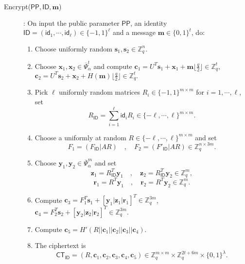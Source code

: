 \documentclass[runningheads,10pt]{llncs}
\def\ZZ{\mathbb{Z}}
\def\bf{\mathbf}
\def\PP{\mathsf{PP}}
\def\CT{\mathsf{CT}}
\def\b{\bf{b}}
\def\c{\bf{c}}
\def\ID{\mathsf{ID}}
\def\id{\mathsf{id}}
\begin{document}
\begin{description}
	\item[Encrypt($\PP,\ID,\bf{m}$)]: On input the public parameter $\PP$, an identity $\ID=(\id_1,\cdots,\id_\ell)\in\{-1,1\}^\ell$ and a message $\bf{m}\in\{0,1\}^t$, do:
	\begin{enumerate}
		\item Choose uniformly random $\bf{s}_1, \bf{s}_2\in\ZZ_q^n.$
		\item Choose $\bf{x}_1,\bf{x}_2\in\overline{\Psi}_\alpha^t$ and compute
		$\c_1 = U^T\bf{s}_1 +\bf{x}_1 +\bf{m}\big\lfloor\frac{q}{2}\big\rfloor \in\ZZ_q^t$,
		$\c_2 = U^T\bf{s}_2 +\bf{x}_2 +H(\bf{m})\big\lfloor\frac{q}{2}\big\rfloor \in\ZZ_q^t.$
		\item Pick $\ell$ uniformly random matrices $R_i\in\{-1,1\}^{m\times m}$ for $i=1,\cdots,\ell$, set
		$$R_{\ID}=\sum_{i=1}^\ell \id_iR_i\in\{-\ell,\cdots,\ell\}^{m\times m}.$$
		\item Choose a uniformly at random $R\in\{-\ell,\cdots, \ell\}^{m\times m}$ and set
		$$F_1=(F_\ID|AR)\quad,\quad F_2=(F'_\ID|AR)\in\ZZ_q^{n\times 3m}.$$
		\item Choose $\bf{y}_1, \bf{y}_2\in\overline{\Psi}_\alpha^m$ and set
		$$\bf{z}_1=R_{\ID}^T\bf{y}_1 \quad,\quad \bf{z}_2=R_{\ID}^T\bf{y}_2\in\ZZ_q^{m},$$
		$$\bf{r}_1=R^T\bf{y}_1 \quad,\quad \bf{r}_2=R^T\bf{y}_2\in\ZZ_q^{m}.$$			
		\item Compute
		$\c_3=F_1^T\bf{s}_1+ \left[\bf{y}_1 | \bf{z}_1 | \bf{r}_1 \right]^T\in\ZZ_q^{3m}$, 
		$\c_4=F_2^T\bf{s}_2+ \left[\bf{y}_2 | \bf{z}_2 | \bf{r}_2 \right]^T\in\ZZ_q^{3m}.$
		\item Compute $\c_5=H'(R||\c_1||\c_2||\c_3||\c_4)$.
		\item The ciphertext is
		$$\CT_\ID=(R,\c_1,\c_2,\c_3,\c_4,\c_5)\in\ZZ_q^{m \times m} \times \ZZ_q^{2t+6m} \times \{0,1\}^\lambda.$$    
	\end{enumerate}
	

\end{description}
\end{document}
